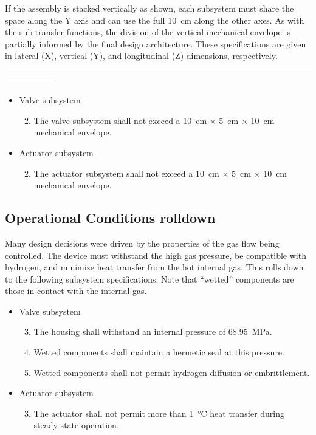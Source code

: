 \documentclass[12pt, letterpaper]{report}%
\newcounter{mycounter}           %
\newcounter{sub}[mycounter]      %
\newcommand{\specPressure}{\SI{68.95}{\mega \pascal}}%
\newcommand{\SpecVB}{The valve subsystem shall not exceed a \SI{10}{\centi\meter} $\times$ \SI{5}{\centi\meter} $\times$ \SI{10}{\centi\meter} mechanical envelope}
\newcommand{\SpecVCA}{The housing shall withstand an internal pressure of \specPressure}
\newcommand{\SpecVCB}{Wetted components shall maintain a hermetic seal at this pressure}
\newcommand{\SpecVCC}{Wetted components shall not permit hydrogen diffusion or embrittlement}
\newcommand{\SpecAB}{The actuator subsystem shall not exceed a \SI{10}{\centi\meter} $\times$ \SI{5}{\centi\meter} $\times$ \SI{10}{\centi\meter} mechanical envelope}
\newcommand{\SpecACA}{The actuator shall not permit more than \SI{1}{\degreeCelsius} heat transfer during steady-state operation}
\begin{document}
			If the assembly is stacked vertically as shown, each subsystem must share the space along the Y axis and can use the full \SI{10}{\centi\meter} along the other axes.
			As with the sub-transfer functions, the division of the vertical mechanical envelope is partially informed by the final design architecture.
			These specifications are given in lateral (X), vertical (Y), and longitudinal (Z) dimensions, respectively.
			\color{white}------------------------------------------------------------------------------------------------------------------------------\color{black}

			\newpage
			\begin{mdframed}
				\begin{itemize}
					\item Valve subsystem
						\begin{enumerate}
							\setcounter{enumi}{1}
							\item \SpecVB.
						\end{enumerate}
					\item Actuator subsystem
						\begin{enumerate}
							\setcounter{enumi}{1}
							\item \SpecAB.
						\end{enumerate}
				\end{itemize}
			\end{mdframed}

		\subsection{Operational Conditions rolldown}
		\label{subsec:Intro:specs:cond}

			Many design decisions were driven by the properties of the gas flow being controlled. The device must withstand the high gas pressure, be compatible with hydrogen, and minimize heat transfer from the hot internal gas.
			This rolls down to the following subsystem specifications.
			Note that ``wetted'' components are those in contact with the internal gas.

			\vspace{1em}
			\begin{mdframed}
				\begin{itemize}
					\item Valve subsystem
						\begin{enumerate}
							\setcounter{enumi}{2}
							\item \SpecVCA.
							\item \SpecVCB.
							\item \SpecVCC.
						\end{enumerate}
					\item Actuator subsystem
						\begin{enumerate}
							\setcounter{enumi}{2}
							\item \SpecACA.
						\end{enumerate}
				\end{itemize}
			\end{mdframed}
		
\end{document}

